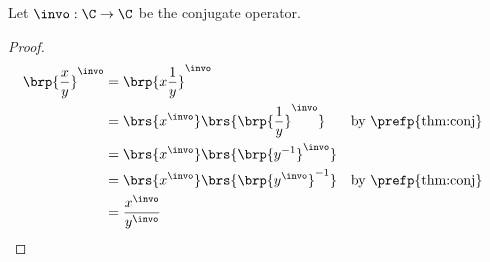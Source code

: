 \begin{corollary}
\label{cor:C_conj}
Let $\invo:\C\to\C$ be the conjugate operator.
\end{corollary}
\begin{proof}
\begin{align*}
  \brp{\frac{x}{y}}^\invo
    &= \brp{x\frac{1}{y}}^\invo
  \\&= \brs{x^\invo} \brs{\brp{\frac{1}{y}}^\invo}
    && \text{by \prefp{thm:conj}}
  \\&= \brs{x^\invo} \brs{\brp{y^{-1}}^\invo}
  \\&= \brs{x^\invo} \brs{\brp{y^\invo}^{-1}}
    && \text{by \prefp{thm:conj}}
  \\&= \frac{x^\invo}{y^\invo}
\end{align*}
\end{proof}



